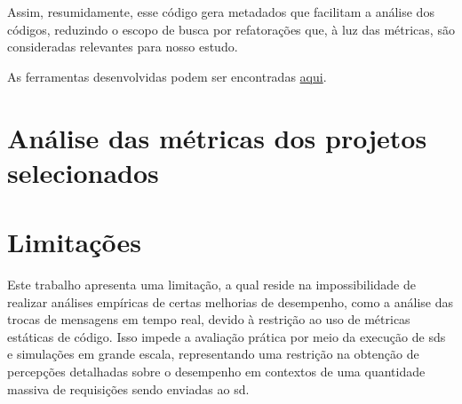 Assim, resumidamente, esse código gera metadados que facilitam a análise dos códigos, reduzindo o escopo de busca por refatorações que, à luz das métricas, são consideradas relevantes para nosso estudo.

As ferramentas desenvolvidas podem ser encontradas \href{https://github.com/BrenoFariasdaSilva/Scientific-Research}{aqui}.

\section{Análise das métricas dos projetos selecionados}

\section{Limitações}
\label{sec:limitacoes}

Este trabalho apresenta uma limitação, a qual reside na impossibilidade de realizar análises empíricas de certas melhorias de desempenho, como a análise das trocas de mensagens em tempo real, devido à restrição ao uso de métricas estáticas de código. Isso impede a avaliação prática por meio da execução de \gls{sds} e simulações em grande escala, representando uma restrição na obtenção de percepções detalhadas sobre o desempenho em contextos de uma quantidade massiva de requisições sendo enviadas ao \gls{sd}.